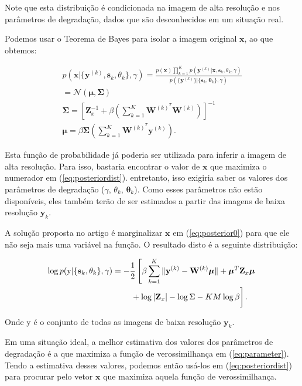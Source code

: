 \documentclass[12pt,openright,oneside,a4paper,english,brazil]{abntex2}
\begin{document}
Note que esta distribuição é condicionada na imagem de alta resolução e nos parâmetros de degradação, dados que são desconhecidos em um situação real.

Podemos usar o Teorema de Bayes para isolar a imagem original $\mathbf{x}$, ao que obtemos:

\begin{gather}
	\label{eq:posteriordist}
	p(\mathbf{x}|\{\mathbf{y}^{(k)},\mathbf{s}_k,\theta_k\}, \gamma) = 
	\frac{p(\mathbf{x})\prod^K_{k=1} p(\mathbf{y}^{(k)}|\mathbf{x},\mathbf{s}_k,\theta_k, \gamma)}
	{p(\{\mathbf{y}^{(k)}\}|\{\mathbf{s}_k,\mathbf{\theta}_k\},\gamma)} \\
	= \mathcal{N}(\boldsymbol{\mu},\mathbf{\Sigma}) \\
	\mathbf{ \Sigma }= \left[\mathbf{Z}^{-1}_x + \beta \left( \sum^K_{k = 1} \mathbf{W}^{(k)^T} \mathbf{W}^{(k)} \right) \right]^{-1} \\
	\boldsymbol{\mu} = \beta \mathbf{ \Sigma } \left( \sum^K_{k=1} \mathbf{W}^{(k)^T}\mathbf{y}^{(k)} \right).
\end{gather}

Esta função de probabilidade já poderia ser utilizada para inferir a imagem de alta resolução.
Para isso, bastaria encontrar o valor de $\mathbf{x}$ que maximiza o numerador em (\ref{eq:posteriordist}). entretanto, isso exigiria saber os valores dos parâmetros de degradação ($\gamma$, $\theta_k$, $\mathbf{\theta}_k$).
Como esses parâmetros não estão disponíveis, eles também terão de ser estimados a partir das imagens de baixa resolução $\mathbf{y}_k$. 

A solução proposta no artigo é marginalizar $\mathbf{x}$ em (\ref{eq:posterior0}) para que ele não seja mais uma variável na função. O resultado disto é a seguinte distribuição:

\begin{align}
	\label{eq:parameter}
	\log p(\mathrm{y}|\{\mathbf{s}_k,\theta_k\}, \gamma) &= -\frac{1}{2}\left[\beta \sum^K_{k=1} \|\mathbf{y}^{(k)} - \mathbf{W}^{(k)}\boldsymbol{\mu}\|
    + \boldsymbol{\mu}^T\mathbf{Z}_x \boldsymbol{\mu} \right. \nonumber \\
    &\qquad \left.\vphantom{\int_t} + \log |\mathbf{Z}_x| - \log{\Sigma} - KM \log \beta \right].
\end{align}

Onde y é o conjunto de todas as imagens de baixa resolução $\mathbf{y}_k$.

Em uma situação ideal, a melhor estimativa dos valores dos parâmetros de degradação é a que maximiza a função de verossimilhança em (\ref{eq:parameter}).
Tendo a estimativa desses valores, podemos então usá-los em (\ref{eq:posteriordist}) para procurar pelo vetor $\mathbf{x}$ que maximiza aquela função de verossimilhança.
\end{document}
